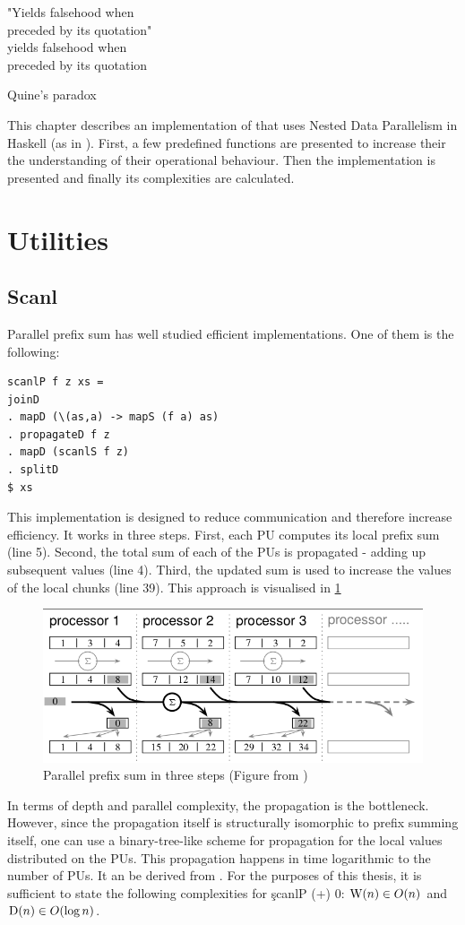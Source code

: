 \epigraph{
"Yields falsehood when \\ preceded by its quotation" \\
yields falsehood when \\ preceded by its quotation
}{
Quine's paradox
}


This chapter describes an implementation of \algo that uses
Nested Data Parallelism in Haskell (as in \cite{Harness2008}).
First, a few predefined functions are presented to
increase their the understanding of their operational behaviour.
Then the implementation is presented
and finally its complexities are calculated.

\section{Utilities}

  \subsection*{Scanl}
    Parallel prefix sum has well studied efficient implementations.
    One of them is the following:
    \begin{lstlisting}   
scanlP f z xs =
joinD
. mapD (\(as,a) -> mapS (f a) as)
. propagateD f z
. mapD (scanlS f z)
. splitD
$ xs
    \end{lstlisting}
    This implementation is designed to reduce communication
    and therefore increase efficiency. It works in three steps.
    First, each PU computes its local prefix sum (line 5).
    Second, the total sum of each of the PUs is propagated
    - adding up subsequent values (line 4).
    Third, the updated sum is used to increase the values of the local chunks (line 39).
    This approach is visualised in \ref{figure:scanlPsteps}
    
    \begin{figure}[h!]
        \includegraphics[width=\linewidth]{scanlP-three-steps.png}
        \caption[Three-Step Parallel Prefix Sum]{Parallel prefix sum in three steps (Figure from \cite{DistTypes1999}) }
        \label{figure:scanlPsteps}
    \end{figure}
    In terms of depth and parallel complexity, the propagation is the bottleneck.
    However, since the propagation itself is structurally isomorphic to prefix summing itself,
    one can use a binary-tree-like scheme for propagation for the local values distributed on the PUs.
    This propagation happens in time logarithmic to the number of PUs.
    It an be derived from \cite{Scanl1980}. For the purposes of this thesis,
    it is sufficient to state the following complexities for \c{scanlP (+) 0}:
    $\textrm{W}(n) \in O(n)$ and $\textrm{D}(n) \in O(\log n)$.

